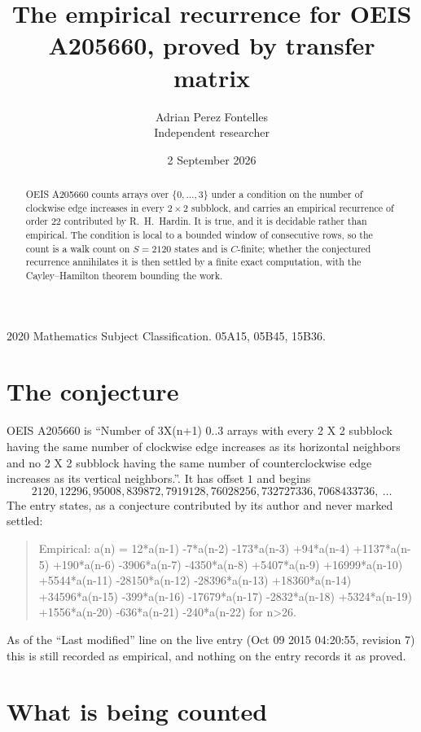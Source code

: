 \documentclass[11pt,a4paper]{article}
\title{The empirical recurrence for OEIS A205660, proved by transfer matrix}
\author{Adrian Perez Fontelles\\ \small Independent researcher}
\date{2 September 2026}
\theoremstyle{plain}
\theoremstyle{definition}
\begin{document}
\maketitle

\begin{abstract}
OEIS A205660 counts arrays over $\{0,\dots,3\}$ under a condition on the number of clockwise edge increases
in every $2\times2$ subblock, and carries an empirical recurrence of order $22$ contributed by
R.~H.~Hardin. It is true, and it is decidable rather than empirical. The condition is local to
a bounded window of consecutive rows, so the count is a walk count on $S=2120$ states and is
$C$-finite; whether the conjectured recurrence annihilates it is then settled by a finite exact
computation, with the Cayley--Hamilton theorem bounding the work.
\end{abstract}

\noindent\small 2020 Mathematics Subject Classification. 05A15, 05B45, 15B36.\normalsize

\section{The conjecture}

OEIS A205660 is ``Number of 3X(n+1) 0..3 arrays with every 2 X 2 subblock having the same number of clockwise edge increases as its horizontal neighbors and no 2 X 2 subblock having the same number of counterclockwise edge increases as its vertical neighbors.''. It has offset $1$ and begins
\[
2120, 12296, 95008, 839872, 7919128, 76028256, 732727336, 7068433736,\ \dots
\]
The entry states, as a conjecture contributed by its author and never marked settled:
\begin{quote}
Empirical: a(n) = 12*a(n-1) -7*a(n-2) -173*a(n-3) +94*a(n-4) +1137*a(n-5) +190*a(n-6) -3906*a(n-7) -4350*a(n-8) +5407*a(n-9) +16999*a(n-10) +5544*a(n-11) -28150*a(n-12) -28396*a(n-13) +18360*a(n-14) +34596*a(n-15) -399*a(n-16) -17679*a(n-17) -2832*a(n-18) +5324*a(n-19) +1556*a(n-20) -636*a(n-21) -240*a(n-22) for n>26.
\end{quote}
As of the ``Last modified'' line on the live entry (Oct 09 2015 04:20:55, revision 7) this is still
recorded as empirical, and nothing on the entry records it as proved.

\section{What is being counted}
\end{document}
